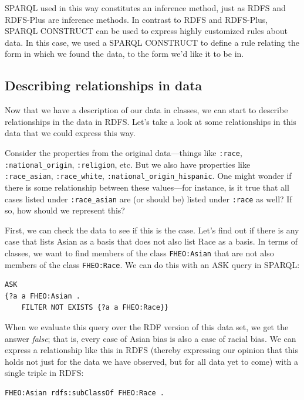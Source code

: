 SPARQL used in this way constitutes an inference method, just as RDFS
and RDFS-Plus are inference methods. In contrast to RDFS and RDFS-Plus,
SPARQL CONSTRUCT can be used to express highly customized rules about
data. In this case, we used a SPARQL CONSTRUCT to define a rule relating
the form in which we found the data, to the form we'd like it to be in.

\subsection{Describing relationships in data}

Now that we have a description of our data in classes, we can start to
describe relationships in the data in RDFS. Let's take a look at some
relationships in this data that we could express this way.

Consider the properties from the original data---things like \texttt{:race},
\texttt{:national\_origin},
\texttt{:religion}, etc. But we also have properties like \texttt{:race\_asian},
\texttt{:race\_white},
\texttt{:national\_origin\_hispanic}. One might wonder if there is some
relationship between these
values---for instance, is it true that all cases listed under
\texttt{:race\_asian} are (or should be) listed under
\texttt{:race} as well? If so, how should we represent this?

First, we can check the data to see if this is the case. Let's find out
if there is any case that lists Asian as a basis that does not also list
Race as a basis. In terms of classes, we want to find members of the
class \texttt{FHEO:Asian} that are not also members of the class \texttt{FHEO:Race}. We
can do this with an ASK query in SPARQL:

\begin{lstlisting}
ASK
{?a a FHEO:Asian .
    FILTER NOT EXISTS {?a a FHEO:Race}}
\end{lstlisting}

When we evaluate this query over the RDF version of this data set, we
get the answer \textit{false}; that is, every case of Asian bias is also a case
of racial bias. We can express a relationship like this in RDFS (thereby
expressing our opinion that this holds not just for the data we have
observed, but for all data yet to come) with a single triple in RDFS:

\begin{lstlisting}
FHEO:Asian rdfs:subClassOf FHEO:Race .
\end{lstlisting}

